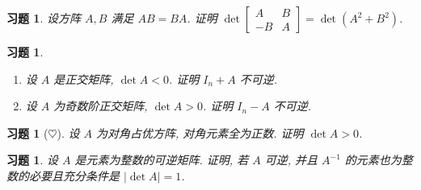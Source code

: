 \documentclass[UTF8]{ctexart}
\newtheorem{ex}[thm]{习题}
\begin{document}
\begin{ex}
  设方阵 \(A,B\) 满足 \(AB=BA\). 证明
  \(\det\begin{bmatrix}A & B\\-B & A\end{bmatrix}=\det(A^2+B^2)\).
\end{ex}


\begin{ex}
  \begin{enumerate}
  \item
    设 \(A\) 是正交矩阵, \(\det A < 0\). 证明 \(I_n + A\) 不可逆.
  \item   设 \(A\) 为奇数阶正交矩阵, \(\det A > 0\).
    证明 \(I_n - A\) 不可逆.
  \end{enumerate}
\end{ex}



\begin{ex}[\(\heartsuit\)]
  设 \(A\) 为对角占优方阵, 对角元素全为正数. 证明 \(\det A > 0\).
\end{ex}



\begin{ex}
  设 \(A\) 是元素为整数的可逆矩阵. 证明, 若 \(A\) 可逆, 并且 \(A^{-1}\)
  的元素也为整数的必要且充分条件是 \(|\det A| =  1\).
\end{ex}
\end{document}
